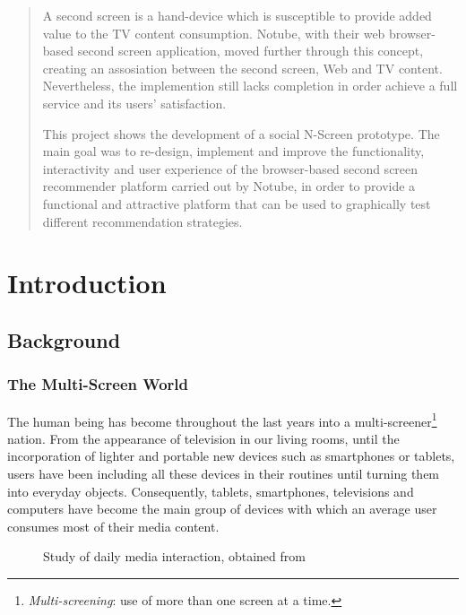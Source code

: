 \documentclass{acm_proc_article-sp}
\begin{document}
\maketitle
\begin{abstract}
A second screen is a hand-device which is susceptible to provide added value to the TV content consumption. Notube, with their web browser-based second screen application, moved further through this concept, creating an assosiation between the second screen, Web and TV content. Nevertheless, the implemention still lacks completion in order achieve a full service and its users' satisfaction.

This project shows the development of a social N-Screen prototype. The main goal was to re-design, implement and improve the functionality, interactivity and user experience of the browser-based second screen recommender platform carried out by Notube, in order to provide a functional and attractive platform that can be used to graphically test different recommendation strategies. 
\end{abstract}

\section{Introduction}

\subsection{Background}

\subsubsection{The Multi-Screen World}

The human being has become throughout the last years into a multi-screener\footnote{\textit{Multi-screening}: use of 
more than one screen at a time.} nation. From the appearance of television in our living rooms, until the incorporation of lighter and portable new devices such as smartphones or tablets, users have been including all these devices in their routines until turning them into everyday objects. Consequently, tablets, smartphones, televisions and computers have become the main group of devices with which an average user consumes most of their media content\cite{multiscreen:google}. 

\begin{figure}[!htb]
\centering
{}
\caption{Study of daily media interaction, obtained from \cite{multiscreen:google}}
\end{figure}
\end{document}
